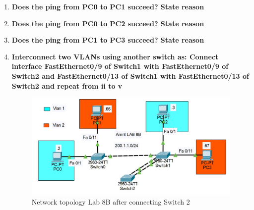 \documentclass[a4paper,11pt]{article}
\begin{document}
\begin{enumerate}







    \item\textbf{  Does the ping from PC0 to PC1 succeed? State reason}



    \item\textbf{  Does the ping from PC0 to PC2 succeed? State reason}



    \item\textbf{  Does the ping from PC1 to PC3 succeed? State reason}



    \item\textbf{  Interconnect two VLANs using another switch as: Connect interface FastEthernet0/9 of
              Switch1 with FastEthernet0/9 of Switch2 and FastEthernet0/13 of Switch1 with
              FastEthernet0/13 of Switch2 and repeat from ii to v}


          \begin{figure}[H]
              \centering
              \includegraphics[scale=0.65,cframe=blue 0.5pt 3pt]{./FIG/Lab8B7.jpg}
              \caption{Network topology Lab 8B after connecting Switch 2 }
          \end{figure}



\end{enumerate}
\end{document}
